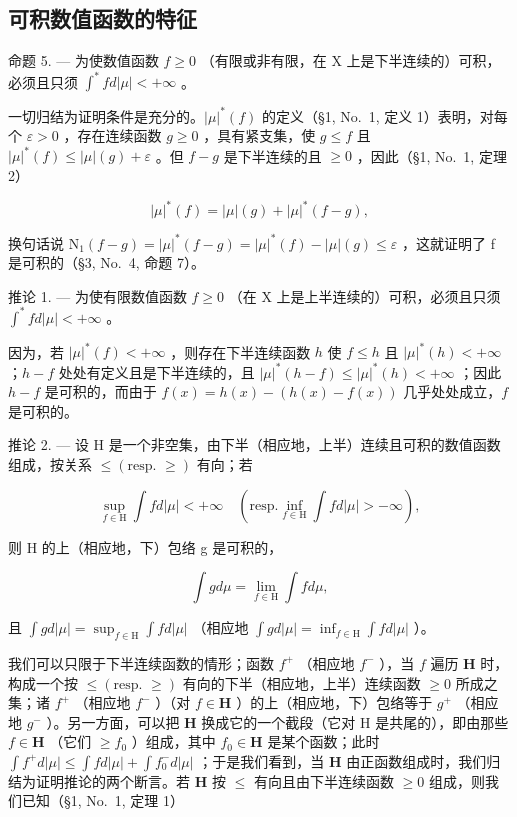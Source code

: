 \subsection{可积数值函数的特征}

命题 5. --- 为使数值函数 \(f \geqslant 0\) （有限或非有限，在 X 上是下半连续的）可积，必须且只须 \(\int^{*} f d|\mu| < +\infty\) 。

一切归结为证明条件是充分的。\(|\mu|^*(f)\) 的定义（§1, No.~1, 定义 1）表明，对每个 \(\varepsilon > 0\) ，存在连续函数 \(g \geqslant 0\) ，具有紧支集，使 \(g \leqslant f\) 且 \(|\mu|^*(f) \leqslant |\mu|(g) + \varepsilon\) 。但 \(f - g\) 是下半连续的且 \(\geqslant 0\) ，因此（§1, No.~1, 定理 2）

\[
| \mu | ^ {*} (f) = | \mu | (g) + | \mu | ^ {*} (f - g),
\]

换句话说 \(\mathrm{N}_{1}(f-g)=|\mu|^{*}(f-g)=|\mu|^{*}(f)-|\mu|(g)\leqslant\varepsilon\) ，这就证明了 f 是可积的（§3, No.~4, 命题 7）。

推论 1. --- 为使有限数值函数 \(f \geqslant 0\) （在 X 上是上半连续的）可积，必须且只须 \(\int^{*} f d|\mu| < +\infty\) 。

因为，若 \(|\mu|^*(f) < +\infty\) ，则存在下半连续函数 \(h\) 使 \(f \leqslant h\) 且 \(|\mu|^*(h) < +\infty\) ；\(h - f\) 处处有定义且是下半连续的，且 \(|\mu|^*(h - f) \leqslant |\mu|^*(h) < +\infty\) ；因此 \(h - f\) 是可积的，而由于 \(f(x) = h(x) - (h(x) - f(x))\) 几乎处处成立，\(f\) 是可积的。

推论 2. --- 设 H 是一个非空集，由下半（相应地，上半）连续且可积的数值函数组成，按关系 \(\leqslant (\text{resp. } \geqslant)\) 有向；若

\[
\sup _ {f \in \mathrm{H}} \int f d | \mu | <   + \infty \quad (\mathrm{resp.} \inf _ {f \in \mathrm{H}} \int f d | \mu | > - \infty),
\]

则 H 的上（相应地，下）包络 g 是可积的，

\[
\int g d \mu = \lim _ {f \in \mathrm{H}} \int f d \mu ,
\]

且 \(\int g d|\mu| = \sup_{f\in \mathrm{H}}\int f d|\mu|\) （相应地 \(\int g d|\mu| = \inf_{f\in \mathrm{H}}\int f d|\mu|\) ）。

我们可以只限于下半连续函数的情形；函数 \(f^{+}\) （相应地 \(f^{-}\) ），当 \(f\) 遍历 \(\mathbf{H}\) 时，构成一个按 \(\leqslant (\text{resp. } \geqslant)\) 有向的下半（相应地，上半）连续函数 \(\geqslant 0\) 所成之集；诸 \(f^{+}\) （相应地 \(f^{-}\) ）（对 \(f \in \mathbf{H}\) ）的上（相应地，下）包络等于 \(g^{+}\) （相应地 \(g^{-}\) ）。另一方面，可以把 \(\mathbf{H}\) 换成它的一个截段（它对 H 是共尾的），即由那些 \(f \in \mathbf{H}\) （它们 \(\geqslant f_{0}\) ）组成，其中 \(f_{0} \in \mathbf{H}\) 是某个函数；此时 \(\int f^{+} d|\mu| \leqslant \int f d|\mu| + \int f_{0}^{-} d|\mu|\) ；于是我们看到，当 \(\mathbf{H}\) 由正函数组成时，我们归结为证明推论的两个断言。若 \(\mathbf{H}\) 按 \(\leqslant\) 有向且由下半连续函数 \(\geqslant 0\) 组成，则我们已知（§1, No.~1, 定理 1）

